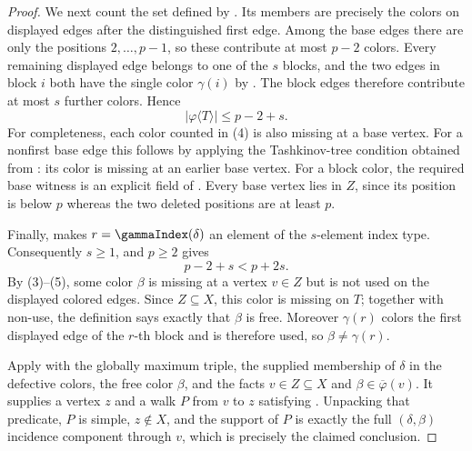 \begin{proof}
We next count the set defined by .  Its members
are precisely the colors on displayed edges after the distinguished
first edge.  Among the base edges there are only the positions
$2,\ldots,p-1$, so these contribute at most $p-2$ colors.  Every
remaining displayed edge belongs to one of the $s$ blocks, and the two
edges in block $i$ both have the single color $\gamma(i)$ by
.  The block edges therefore
contribute at most $s$ further colors.  Hence
\[
             |\varphi\langle T\rangle|\le p-2+s.                   \tag{4}
\]
For completeness, each color counted in (4) is also missing at a base
vertex.  For a nonfirst base edge this follows by applying the
Tashkinov-tree condition  obtained from
: its color is missing at an earlier base
vertex.  For a block color, the required base witness is an explicit
field of .  Every base vertex
lies in $Z$, since its position is below $p$ whereas the two deleted
positions are at least $p$.

Finally,  makes
$r=\gammaIndex(\delta)$ an element of the $s$-element index type.
Consequently $s\ge1$, and $p\ge2$ gives
\[
                         p-2+s<p+2s.                               \tag{5}
\]
By (3)--(5), some color $\beta$ is missing at a vertex $v\in Z$ but is
not used on the displayed colored edges.  Since $Z\subseteq X$, this
color is missing on $T$; together with non-use, the definition
 says exactly that $\beta$ is free.  Moreover
$\gamma(r)$ colors the first displayed edge of the $r$-th block and is
therefore used, so $\beta\ne\gamma(r)$.

Apply  with the globally
maximum triple, the supplied membership of $\delta$ in the defective
colors, the free color $\beta$, and the facts $v\in Z\subseteq X$ and
$\beta\in\overline\varphi(v)$.  It supplies a vertex $z$ and a walk
$P$ from $v$ to $z$ satisfying
.  Unpacking that predicate, $P$ is
simple, $z\notin X$, and the support of $P$ is exactly the full
$(\delta,\beta)$ incidence component through $v$, which is precisely
the claimed conclusion.
\end{proof}
